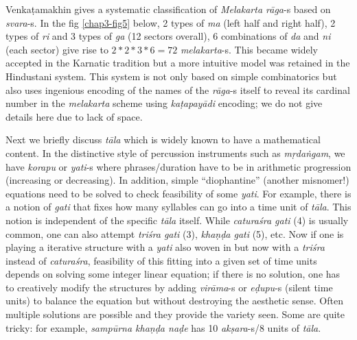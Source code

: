 Venkaṭamakhin gives a systematic classification of \textsl{Melakarta rāga}-s based on \textsl{svara}-s. In the fig \ref{chap3-fig5} below, 2 types of \textsl{ma} (left half and right half), 2 types of \textsl{ri} and 3 types of \textsl{ga} (12 sectors overall), 6 combinations of \textsl{da} and \textsl{ni} (each sector) give rise to $2*2*3*6=72$ \textsl{melakarta}-s. This became widely accepted in the Karnatic
 tradition but a more intuitive model was retained in the Hindustani system. This system is not only based on simple combinatorics but also uses ingenious encoding of the names of the \textsl{rāga}-s itself to reveal its cardinal number in the \textsl{melakarta} scheme using \textsl{kaṭapayādi} encoding; we do not give details here due to lack of space.

Next we briefly discuss \textsl{tāla} which is widely known to have a mathematical content. In the distinctive style of percussion instruments such as \textsl{mṛdaṅgam}, we have \textsl{korapu} or \textsl{yati}-s where phrases/duration have to be in arithmetic progression (increasing or decreasing). In addition, simple “diophantine” (another misnomer!) equations need to be solved to check feasibility of some \textsl{yati}. For example, there is a notion of \textsl{gati}
 that fixes how many syllables can go into a time unit of \textsl{tāla}. This notion is independent of the specific \textsl{tāla} itself. While \textsl{caturaśra gati} (4) is usually common, one can also attempt \textsl{triśra gati} (3), \textsl{khaṇḍa gati} (5), etc. Now if one is playing a iterative structure with a \textsl{yati} also woven in but now with a \textsl{triśra} instead of \textsl{caturaśra}, feasibility of this fitting into a given set of time units depends on solving some integer linear equation; if there is no solution, one has to creatively modify the structures by adding \textsl{virāma}-s or \textsl{eḍupu}-s (silent time units) to balance the equation but without destroying the aesthetic sense. Often multiple solutions are possible and they provide the variety seen. Some are quite tricky: for example, \textsl{sampūrna khaṇḍa naḍe} has 10 \textsl{akṣara}-s/8 units of \textsl{tāla}.

